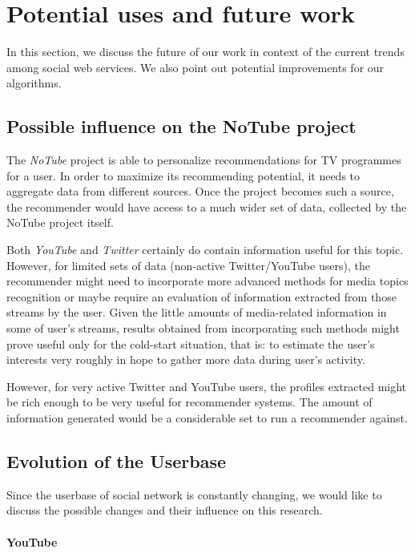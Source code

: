 \section{Potential uses and future work}

In this section, we discuss the future of our work in context of the current
trends among social web services. We also point out potential improvements for
our algorithms.

\subsection{Possible influence on the NoTube project}

The \textit{NoTube} project is able to personalize recommendations for TV
programmes for a user. In order to maximize its recommending potential, it
needs to aggregate data from different sources. Once the project becomes such a
source, the recommender would have access to a much wider set of data,
collected by the NoTube project itself.

Both \textit{YouTube} and \textit{Twitter} certainly do contain information
useful for this topic. However, for limited sets of data (non-active
Twitter/YouTube users), the recommender might need to 
incorporate more advanced methods for media topics recognition or maybe require
an evaluation of information extracted from those streams by the user.
Given the little amounts of media-related information in some of user's
streams, results obtained from incorporating such methods might prove useful
only for the cold-start situation, that is: to estimate the user's interests
very roughly in hope to gather more data during user's activity.

However, for very active Twitter and YouTube users, the profiles extracted
might be rich enough to be very useful for recommender systems. The amount of
information generated would be a considerable set to run a recommender against.

\subsection{Evolution of the Userbase}

Since the userbase of social network is constantly changing, we would like to
discuss the possible changes and their influence on this research.

\paragraph{YouTube}

